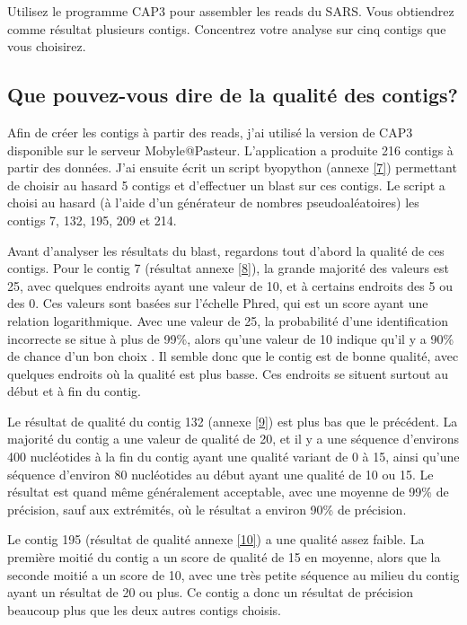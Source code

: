 \documentclass[11pt]{article} %
\begin{document}
Utilisez le programme CAP3 pour assembler les reads du SARS. Vous obtiendrez comme résultat plusieurs contigs. Concentrez
votre analyse sur cinq contigs que vous choisirez.

\subsection[Qualité des contigs]{Que pouvez-vous dire de la qualité des contigs?}

Afin de créer les contigs à partir des reads, j'ai utilisé la version de CAP3 disponible sur le serveur Mobyle@Pasteur.
L'application a produite 216 contigs à partir des données. J'ai ensuite écrit un script byopython (annexe \ref{7}) permettant de choisir
au hasard 5 contigs et d'effectuer un blast sur ces contigs. Le script a choisi au hasard (à l'aide d'un générateur de
nombres pseudoaléatoires) les contigs 7, 132, 195, 209 et 214.

Avant d'analyser les résultats du blast, regardons tout d'abord la qualité de ces contigs. Pour le contig 7 (résultat annexe \ref{8}),
la grande majorité des valeurs est 25, avec quelques endroits ayant une valeur de 10, et à certains endroits des 5 ou des 0.
Ces valeurs sont basées sur l'échelle Phred, qui est un score ayant une relation logarithmique. Avec une valeur de 25, 
la probabilité d'une identification incorrecte se situe à plus de 99\%, alors qu'une valeur de 10 indique qu'il y a 90\% de chance
d'un bon choix . Il semble donc que le contig est de bonne qualité, avec quelques endroits où la qualité est plus basse. Ces endroits
se situent surtout au début et à fin du contig.

Le résultat de qualité du contig 132 (annexe \ref{9}) est plus bas que le précédent. La majorité du contig a une valeur de qualité
de 20, et il y a une séquence d'environs 400 nucléotides à la fin du contig ayant une qualité variant de 0 à 15, ainsi qu'une séquence
d'environ 80 nucléotides au début ayant une qualité de 10 ou 15. Le résultat est quand même généralement acceptable, avec une moyenne de
99\% de précision, sauf aux extrémités, où le résultat a environ 90\% de précision.

Le contig 195 (résultat de qualité annexe \ref{10}) a une qualité assez faible. La première moitié du contig a un score de
qualité de 15 en moyenne, alors que la seconde moitié a un score de 10, avec une très petite séquence au milieu du contig
ayant un résultat de 20 ou plus. Ce contig a donc un résultat de précision beaucoup plus que les deux autres contigs choisis.
\end{document}
